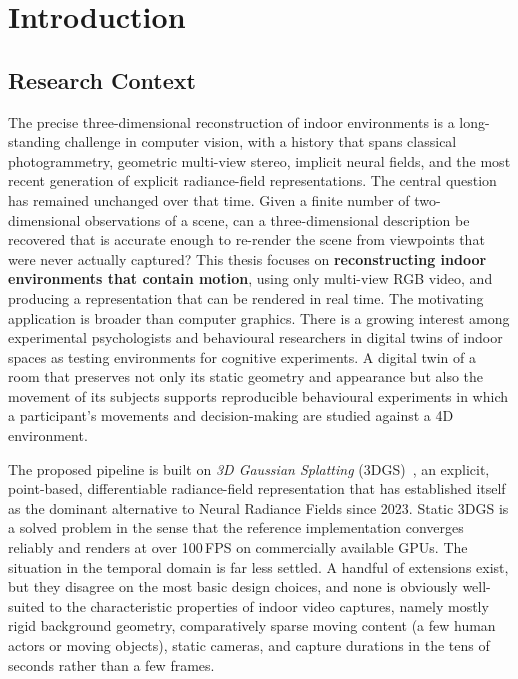 \chapter{Introduction}
\label{ch:intro}

\section{Research Context}

The precise three-dimensional reconstruction of indoor environments is a
long-standing challenge in computer vision, with a history that spans classical
photogrammetry, geometric multi-view stereo, implicit neural fields, and the
most recent generation of explicit radiance-field representations. The central
question has remained unchanged over that time. Given a finite number of
two-dimensional observations of a scene, can a three-dimensional description be
recovered that is accurate enough to re-render the scene from viewpoints that
were never actually captured? This thesis focuses on \textbf{reconstructing
indoor environments that contain motion}, using only multi-view RGB video, and
producing a representation that can be rendered in real time. The motivating
application is broader than computer graphics. There is a growing interest among
experimental psychologists and behavioural researchers in digital twins of
indoor spaces as testing environments for cognitive experiments. A digital twin
of a room that preserves not only its static geometry and appearance but also
the movement of its subjects supports reproducible behavioural experiments in
which a participant's movements and decision-making are studied against a 4D
environment.

The proposed pipeline is built on
\emph{3D Gaussian Splatting} (3DGS)~\cite{kerbl2023}, an explicit, point-based,
differentiable radiance-field representation that has established itself as the
dominant alternative to Neural Radiance Fields since 2023. Static 3DGS is a
solved problem in the sense that the reference implementation converges reliably
and renders at over 100\,FPS on commercially available GPUs. The situation in
the temporal domain is far less settled. A handful of extensions exist, but they
disagree on the most basic design choices, and none is obviously well-suited to
the characteristic properties of indoor video captures, namely mostly rigid
background geometry, comparatively sparse moving content (a few human actors or
moving objects), static cameras, and capture durations in the tens of seconds
rather than a few frames.

